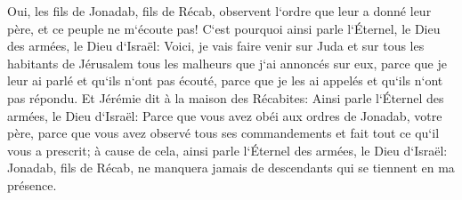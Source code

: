 \verse Oui, les fils de Jonadab, fils de Récab, observent l`ordre que leur a donné leur père, et ce peuple ne m`écoute pas! 
\verse C`est pourquoi ainsi parle l`Éternel, le Dieu des armées, le Dieu d`Israël: Voici, je vais faire venir sur Juda et sur tous les habitants de Jérusalem tous les malheurs que j`ai annoncés sur eux, parce que je leur ai parlé et qu`ils n`ont pas écouté, parce que je les ai appelés et qu`ils n`ont pas répondu. 
\verse Et Jérémie dit à la maison des Récabites: Ainsi parle l`Éternel des armées, le Dieu d`Israël: Parce que vous avez obéi aux ordres de Jonadab, votre père, parce que vous avez observé tous ses commandements et fait tout ce qu`il vous a prescrit; 
\verse à cause de cela, ainsi parle l`Éternel des armées, le Dieu d`Israël: Jonadab, fils de Récab, ne manquera jamais de descendants qui se tiennent en ma présence. 

\chapter{}

